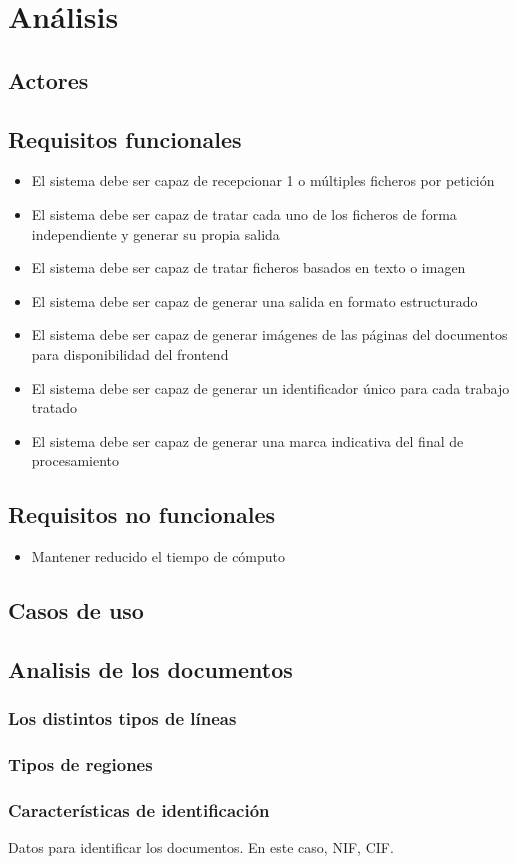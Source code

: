 
\chapter{Análisis}
\label{chap:analisis}

\section{Actores}

\section{Requisitos funcionales}

\begin{itemize}
\item El sistema debe ser capaz de recepcionar 1 o múltiples ficheros por petición
\item El sistema debe ser capaz de tratar cada uno de los ficheros de forma independiente y generar su propia salida
\item El sistema debe ser capaz de tratar ficheros basados en texto o imagen
\item El sistema debe ser capaz de generar una salida en formato estructurado
\item El sistema debe ser capaz de generar imágenes de las páginas del documentos para disponibilidad del frontend
\item El sistema debe ser capaz de generar un identificador único para cada trabajo tratado
\item El sistema debe ser capaz de generar una marca indicativa del final de procesamiento
\end{itemize}

\section{Requisitos no funcionales}

\begin{itemize}
\item Mantener reducido el tiempo de cómputo    
\end{itemize}

\section{Casos de uso}

\section{Analisis de los documentos}

\subsection{Los distintos tipos de líneas}

\subsection{Tipos de regiones}

\subsection{Características de identificación}

Datos para identificar los documentos. En este caso, NIF, CIF.
